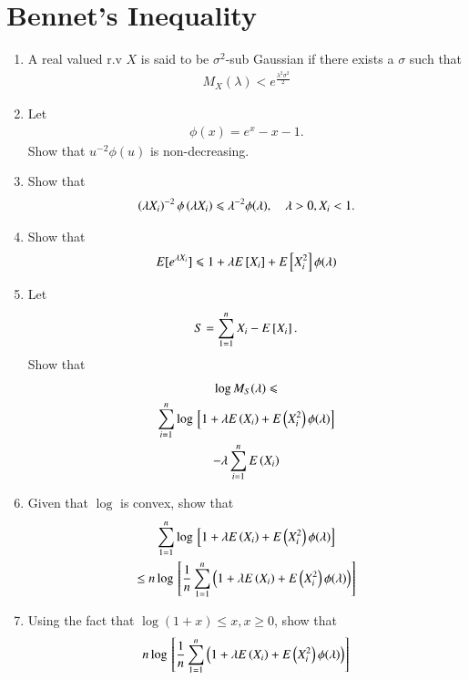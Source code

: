 \documentclass[journal,12pt,twocolumn]{IEEEtran}
\renewcommand\thesection{\arabic{section}}
\begin{document}
\section{Bennet's Inequality}
\begin{enumerate}[label=\thesection.\arabic*,ref=\thesection.\theenumi]
\item A real valued r.v $X$ is  said to be $\sigma^2$-sub Gaussian if there exists a $\sigma$ such that 
\begin{align}
M_{X}(\lambda) < e^{\frac{\lambda^2 \sigma^2}{2}}
\end{align}
\item Let
\begin{align}
\phi(x) = e^x - x -1.
\end{align}
%
Show that $u^{-2}\phi(u)$ is non-decreasing.
\item  Show that
\begin{align}
\left(\lambda X_i\right)^{-2} \phi \left(\lambda X_i\right)\leqslant \lambda^{-2} \phi (\lambda), \quad \lambda > 0, X_i < 1.
\end{align}
\item Show that
\begin{align}
E[e^{\lambda X_i}]\leqslant 1+\lambda E{}\left[ X_i\right]+E{}\left[X_i^2\right]\phi (\lambda)
\end{align}
\item Let 
\begin{align}
S = \sum_{1=1}^{n} X_i - E{}\left[X_i\right].
\end{align}
%
Show that 
\begin{multline}
\label{eq:bennet_mgf}
\log M_{S}(\lambda) \leqslant  
\\
\sum_{i=1}^{n} \log{}\left[1+\lambda E\left( X_i\right)+E\left(X_i^2\right) \phi (\lambda)\right] 
\\
- \lambda \sum_{i=1}^{n}E \left(X_i\right)
\end{multline}
\item Given that $\log$ is convex, show that
\begin{multline}
\sum_{1=1}^{n} \log {}\left[1+\lambda E\left(X_i\right)+E\left(X_i^2\right)\phi (\lambda)\right]
\\
\le 
n \log {}\left[\frac{1}{n} \sum_{1=1}^{n}\left(1+\lambda E\left(X_i\right)+E\left(X_i^2\right)\phi (\lambda)\right)\right]
\end{multline}
\item Using the fact that $\log (1+x) \leqslant x, x \geqslant 0$, show that 
\begin{multline}
\label{eq:bennet_log_ineq}
n \log \sbrak{\frac{1}{n} \sum_{1=1}^{n}\brak{1+\lambda E\brak{X_i}+E\brak{X_i^2}\phi (\lambda)}}

\end{multline}
\end{enumerate}
\end{document}
